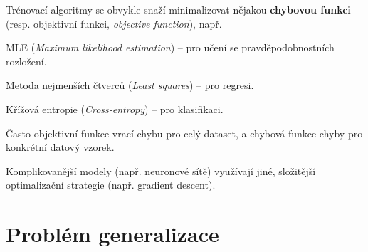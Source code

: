 \begin{compactitem}
    \item Trénovací algoritmy se obvykle snaží minimalizovat nějakou \textbf{chybovou funkci} (resp. objektivní funkci, \textit{objective function}), např. \begin{compactitem}
        \item MLE (\textit{Maximum likelihood estimation}) -- pro učení se pravděpodobnostních rozložení.

        \item Metoda nejmenších čtverců (\textit{Least squares}) -- pro regresi.

        \item Křížová entropie (\textit{Cross-entropy}) -- pro klasifikaci.
    \end{compactitem}

    \item Často objektivní funkce vrací chybu pro celý dataset, a chybová funkce chyby pro konkrétní datový vzorek.

    \item Komplikovanější modely (např. neuronové sítě) využívají jiné, složitější optimalizační strategie (např. gradient descent).
\end{compactitem}


\section{Problém generalizace}

